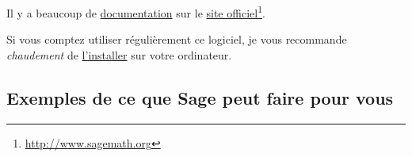 Il y a beaucoup de \href{http://lmgtfy.com/?q=sage+documentation}{documentation} sur le \href{http://www.sagemath.org}{site officiel}\footnote{\href{http://www.sagemath.org}{http://www.sagemath.org}}.

Si vous comptez utiliser régulièrement ce logiciel, je vous recommande \emph{chaudement} de \href{http://mirror.switch.ch/mirror/sagemath/index.html}{l'installer} sur votre ordinateur.

\subsection{Exemples de ce que Sage peut faire pour vous}

